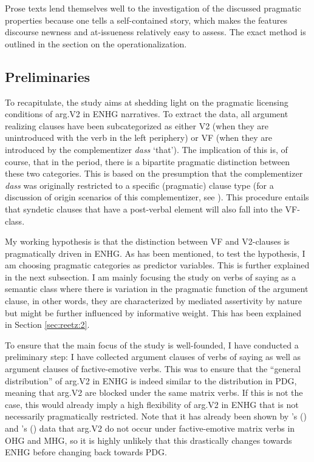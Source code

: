 \documentclass[output=paper,colorlinks,citecolor=brown]{langscibook}
\begin{document}
Prose texts lend themselves well to the investigation of the discussed pragmatic properties because one  tells a self-contained story, which makes the features discourse newness and at-issueness relatively easy to assess. The exact method is outlined in the section on the operationalization.

\subsection{Preliminaries}\label{sec:reetz:4.2}

To recapitulate, the study aims at shedding light on the pragmatic licensing conditions of arg.V2 in ENHG narratives. To extract the data, all argument realizing clauses have been subcategorized as either V2 (when they are unintroduced with the verb in the left periphery) or VF (when they are introduced by the complementizer \textit{dass} `that'). The implication of this is, of course, that in the  period, there is a bipartite pragmatic distinction between these two categories. This is based on the presumption that the complementizer \textit{dass} was originally restricted to a specific (pragmatic) clause type (for a discussion of origin scenarios of this complementizer, see \citealt[91--126]{Axel2012}). This procedure entails that syndetic clauses that have a post-verbal element will also fall into the VF-class.

My working hypothesis is that the distinction between VF and V2-clauses is pragmatically driven in ENHG. As has been mentioned, to test the hypothesis, I am choosing pragmatic categories as predictor variables. This is further explained in the next subsection. I am mainly focusing the study on verbs of saying as a semantic class where there is variation in the pragmatic function of the argument clause, in other words, they are characterized by mediated assertivity by nature but might be further influenced by informative weight. This has been explained in Section \ref{sec:reetz:2}.

To ensure that the main focus of the study is well-founded, I have conducted a preliminary step: I have collected argument clauses of verbs of saying as well as argument clauses of factive-emotive verbs. This was to ensure that the “general distribution” of arg.V2 in ENHG is indeed similar to the distribution in PDG, meaning that arg.V2 are blocked under the same matrix verbs. If this is not the case, this would already imply a high flexibility of arg.V2 in ENHG that is not necessarily pragmatically restricted. Note that it has already been shown by \citeauthor{Axel2012}'s (\citeyear{Axel2012}) and \citeauthor{Petrova2020a}'s (\citeyear{Petrova2020a}) data that arg.V2 do not occur under factive-emotive matrix verbs in OHG and MHG, so it is highly unlikely that this drastically changes towards ENHG before changing  back towards PDG.
\end{document}

